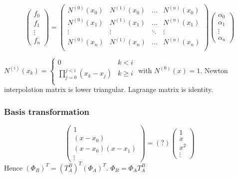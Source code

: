 \documentclass[11pt]{article}
\begin{document}
    \begin{equation*}
      \begin{pmatrix}
        f_0\\
        f_1\\
        \vdots\\
        f_n
      \end{pmatrix}=
      \begin{pmatrix}
        N^{(0)}(x_0) & N^{(1)}(x_0) & \dots & N^{(n)}(x_0)\\
        N^{(0)}(x_1) & N^{(1)}(x_1) & \dots & N^{(n)}(x_1)\\
        \vdots & \vdots & \ddots&\vdots\\
        N^{(0)}(x_n) & N^{(1)}(x_n) & \dots & N^{(n)}(x_n)\\
      \end{pmatrix}
      \begin{pmatrix}
        \alpha_0\\
        \alpha_1\\
        \vdots\\
        \alpha_n
      \end{pmatrix}
    \end{equation*}

    \(N^{(i)}(x_k)=\begin{cases}
      0&k<i\\
      \prod_{j=0}^{j<i}(x_k-x_j)&k\ge i\\
    \end{cases}\) with \(N^{(0)}(x) = 1\).
    Newton interpolation matrix is lower triangular.
    Lagrange matrix is identity.
    \subsubsection{Basis transformation}
    \label{sec:org32b4e0b}
    \begin{equation*}
      \begin{pmatrix}
        1\\
        (x-x_0)\\
        (x-x_0)(x-x_1)\\
        \vdots
      \end{pmatrix}=(?)
      \begin{pmatrix}
        1\\
        x\\
        x^2\\
        \vdots
      \end{pmatrix}
    \end{equation*}
    Hence \((\Phi_B)^T=(T_A^B)^T(\Phi_A)^T\).
    \(\Phi_B=\Phi_AT_A^B\)
\end{document}
